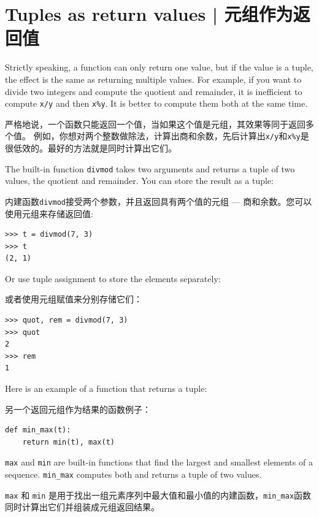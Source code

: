 \section{Tuples as return values | 元组作为返回值}
  

Strictly speaking, a function can only return one value, but
if the value is a tuple, the effect is the same as returning
multiple values.  For example, if you want to divide two integers
and compute the quotient and remainder, it is inefficient to
compute {\tt x/y} and then {\tt x\%y}.  It is better to compute
them both at the same time.

严格地说，一个函数只能返回一个值，当如果这个值是元组，其效果等同于返回多个值。 例如，你想对两个整数做除法，计算出商和余数，先后计算出\lstinline{x/y}和\lstinline{x%y}是很低效的。最好的方法就是同时计算出它们。

The built-in function {\tt divmod} takes two arguments and
returns a tuple of two values, the quotient and remainder.
You can store the result as a tuple:

内建函数\lstinline{divmod}接受两个参数，并且返回具有两个值的元组 --- 商和余数。您可以使用元组来存储返回值:

\begin{lstlisting}
>>> t = divmod(7, 3)
>>> t
(2, 1)
\end{lstlisting}
%
Or use tuple assignment to store the elements separately:

或者使用元组赋值来分别存储它们：


\begin{lstlisting}
>>> quot, rem = divmod(7, 3)
>>> quot
2
>>> rem
1
\end{lstlisting}
%
Here is an example of a function that returns a tuple:

另一个返回元组作为结果的函数例子：

\begin{lstlisting}
def min_max(t):
    return min(t), max(t)
\end{lstlisting}
%
{\tt max} and {\tt min} are built-in functions that find
the largest and smallest elements of a sequence.  \verb"min_max"
computes both and returns a tuple of two values.

\lstinline{max} 和 \lstinline{min} 是用于找出一组元素序列中最大值和最小值的内建函数，\lstinline{min_max}函数同时计算出它们并组装成元组返回结果。
 
 



